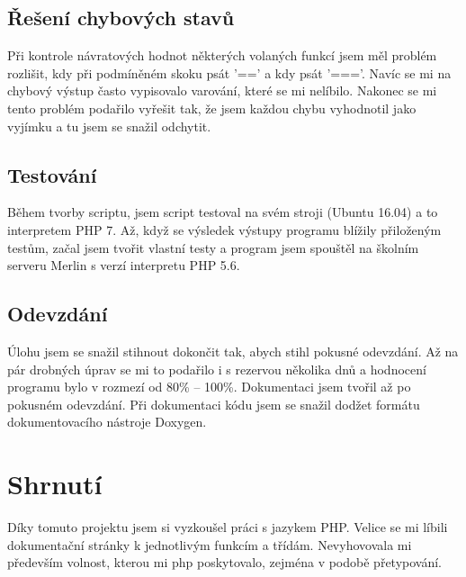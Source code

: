 \documentclass[a4paper, 10pt]{article}
\begin{document}
        \subsection{Řešení chybových stavů}
            Při kontrole návratových hodnot některých volaných funkcí jsem měl
            problém rozlišit, kdy při podmíněném skoku psát '==' a kdy psát '==='.
            Navíc se mi na chybový výstup často vypisovalo varování, které se mi
            nelíbilo. Nakonec se mi tento problém podařilo vyřešit tak, že jsem
            každou chybu vyhodnotil jako vyjímku a tu jsem se snažil odchytit.
        \subsection{Testování}
            Během tvorby scriptu, jsem script testoval na svém stroji (Ubuntu 16.04)
            a to interpretem PHP 7. Až, když se výsledek výstupy programu blížily
            přiloženým testům, začal jsem tvořit vlastní testy a program jsem spouštěl
            na školním serveru Merlin s verzí interpretu PHP 5.6.
        \subsection{Odevzdání}
            Úlohu jsem se snažil stihnout dokončit tak, abych stihl pokusné odevzdání.
            Až na pár drobných úprav se mi to podařilo i s rezervou několika dnů
            a hodnocení programu bylo v rozmezí od 80\% -- 100\%. Dokumentaci jsem
            tvořil až po pokusném odevzdání. Při dokumentaci kódu jsem se snažil
            dodžet formátu dokumentovacího nástroje Doxygen.
    \section{Shrnutí}
        Díky tomuto projektu jsem si vyzkoušel práci s jazykem PHP. Velice se mi
        líbili dokumentační stránky k jednotlivým funkcím a třídám. Nevyhovovala
        mi především volnost, kterou mi php poskytovalo, zejména v podobě
        přetypování.
\end{document}

